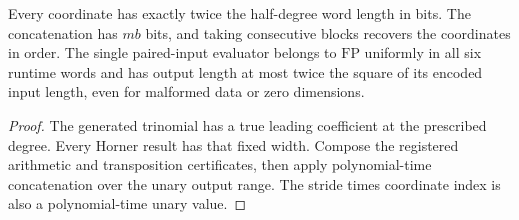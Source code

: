 \begin{theorem}
  \label{thm:lowerbounds-algebraic-encoded-condenser-fp}
  \leanok
  Every coordinate has exactly twice the half-degree word length
  in bits. The concatenation has $mb$ bits, and taking consecutive
  blocks recovers the coordinates in order. The single paired-input
  evaluator belongs to $\mathrm{FP}$ uniformly in all six runtime
  words and has output length at most twice the square of its
  encoded input length, even for malformed data or zero dimensions.
\end{theorem}
\begin{proof}
  \leanok
  The generated trinomial has a true leading coefficient at the
  prescribed degree. Every Horner result has that fixed width.
  Compose the registered arithmetic and transposition certificates,
  then apply polynomial-time concatenation over the unary output range.
  The stride times coordinate index is also a polynomial-time unary value.
\end{proof}

